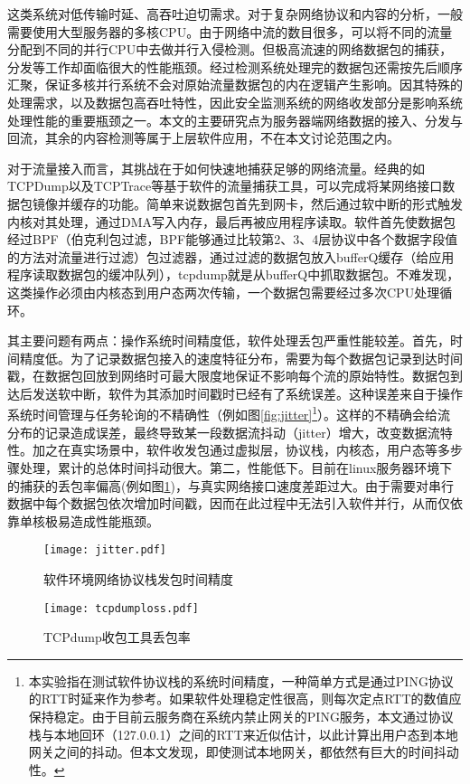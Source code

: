 这类系统对低传输时延、高吞吐迫切需求。对于复杂网络协议和内容的分析，一般需要使用大型服务器的多核CPU。由于网络中流的数目很多，可以将不同的流量分配到不同的并行CPU中去做并行入侵检测。但极高流速的网络数据包的捕获，分发等工作却面临很大的性能瓶颈。经过检测系统处理完的数据包还需按先后顺序汇聚，保证多核并行系统不会对原始流量数据包的内在逻辑产生影响。因其特殊的处理需求，以及数据包高吞吐特性，因此安全监测系统的网络收发部分是影响系统处理性能的重要瓶颈之一。本文的主要研究点为服务器端网络数据的接入、分发与回流，其余的内容检测等属于上层软件应用，不在本文讨论范围之内。





\label{chap342}

对于流量接入而言，其挑战在于如何快速地捕获足够的网络流量。经典的如TCPDump以及TCPTrace等基于软件的流量捕获工具，可以完成将某网络接口数据包镜像并缓存的功能。简单来说数据包首先到网卡，然后通过软中断的形式触发内核对其处理，通过DMA写入内存，最后再被应用程序读取。软件首先使数据包经过BPF（伯克利包过滤，BPF能够通过比较第2、3、4层协议中各个数据字段值的方法对流量进行过滤）包过滤器，通过过滤的数据包放入bufferQ缓存（给应用程序读取数据包的缓冲队列），tcpdump就是从bufferQ中抓取数据包。不难发现，这类操作必须由内核态到用户态两次传输，一个数据包需要经过多次CPU处理循环。

其主要问题有两点：操作系统时间精度低，软件处理丢包严重性能较差。首先，时间精度低。为了记录数据包接入的速度特征分布，需要为每个数据包记录到达时间戳，在数据包回放到网络时可最大限度地保证不影响每个流的原始特性。数据包到达后发送软中断，软件为其添加时间戳时已经有了系统误差。这种误差来自于操作系统时间管理与任务轮询的不精确性（例如图\ref{fig:jitter}\footnote{本实验指在测试软件协议栈的系统时间精度，一种简单方式是通过PING协议的RTT时延来作为参考。如果软件处理稳定性很高，则每次定点RTT的数值应保持稳定。由于目前云服务商在系统内禁止网关的PING服务，本文通过协议栈与本地回环（127.0.0.1）之间的RTT来近似估计，以此计算出用户态到本地网关之间的抖动。但本文发现，即使测试本地网关，都依然有巨大的时间抖动性。}）。这样的不精确会给流分布的记录造成误差，最终导致某一段数据流抖动（jitter）增大，改变数据流特性。加之在真实场景中，软件收发包通过虚拟层，协议栈，内核态，用户态等多步骤处理，累计的总体时间抖动很大。第二，性能低下。目前在linux服务器环境下的捕获的丢包率偏高(例如图\ref{fig:tcpdumploss})，与真实网络接口速度差距过大。由于需要对串行数据中每个数据包依次增加时间戳，因而在此过程中无法引入软件并行，从而仅依靠单核极易造成性能瓶颈。



\begin{figure}[htbp]
	\centering 
	\vspace{-1.5mm}
	\begin{minipage}[t]{0.48\textwidth}
		\centering
		\texttt{[image: jitter.pdf]}
		\caption{软件环境网络协议栈发包时间精度} \label{fig:jitter}
	\end{minipage}
	\begin{minipage}[t]{0.48\textwidth}
		\centering
		\texttt{[image: tcpdumploss.pdf]}
		\caption{TCPdump收包工具丢包率} \label{fig:tcpdumploss}
	\end{minipage}
\end{figure}

